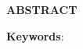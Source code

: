 \begin{center}
    \textbf{ABSTRACT}

    \textbf{\doctitle}
\end{center}

\lipsum[1-2]

\noindent \textbf{Keywords}: \keywords
